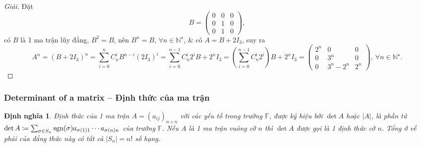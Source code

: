 \documentclass{article}
\newtheorem{dinhnghia}{Định nghĩa}
\begin{document}
\begin{proof}[Giải]
	Đặt
	\begin{equation*}
		B = \begin{pmatrix}
			0 & 0 & 0\\0 & 1 & 0\\0 & 1 & 0
		\end{pmatrix},
	\end{equation*}
	có $B$ là 1 ma trận lũy đẳng, $B^2 = B$, nên $B^n = B$, $\forall n\in\mathbb{N}^\star$, \& có $A = B + 2I_3$, suy ra
	\begin{equation*}
		A^n = (B + 2I_3)^n = \sum_{i=0}^n C_n^iB^{n-i}(2I_3)^i = \sum_{i=0}^{n-1} C_n^i2^iB + 2^nI_3 = \left(\sum_{i=0}^{n-1} C_n^i2^i\right)B + 2^nI_3 = \begin{pmatrix}
			2^n & 0 & 0\\0 & 3^n & 0\\0 & 3^n - 2^n & 2^n
		\end{pmatrix},\ \forall n\in\mathbb{N}^\star.
	\end{equation*}
\end{proof}


\subsubsection{Determinant of a matrix -- Định thức của ma trận}
\begin{dinhnghia}
	{\rm Định thức} của 1 ma trận $A = (a_{ij})_{n\times n}$ với các yếu tố trong trường $\mathbb{F}$, được ký hiệu bởi $\det A$ hoặc $|A|$, là phần tử $\det A\coloneqq\sum_{\sigma\in S_n} {\rm sgn}(\sigma)a_{\sigma(1)1}\cdots a_{\sigma(n)n}$ của trường $\mathbb{F}$. Nếu $A$ là 1 ma trận vuông cỡ $n$ thì $\det A$ được gọi là 1 {\rm định thức cỡ $n$}. Tổng ở vế phải của đẳng thức này có tất cả $|S_n| = n!$ số hạng.
\end{dinhnghia}
\end{document}
